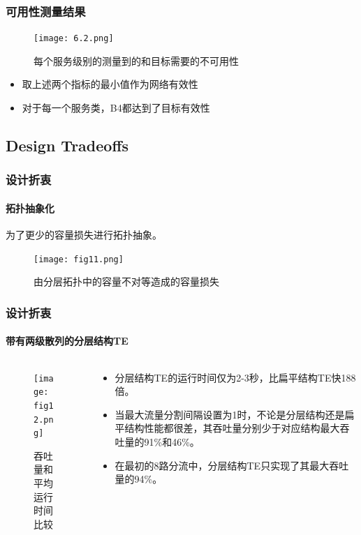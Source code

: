 \begin{frame}
\frametitle{可用性测量结果}
    \begin{figure}
        \centering
        \texttt{[image: 6.2.png]}
        \caption{每个服务级别的测量到的和目标需要的不可用性} %
    \end{figure}
    
    \begin{itemize}
        \item 取上述两个指标的最小值作为网络有效性  
        \item 对于每一个服务类，B4都达到了目标有效性
    \end{itemize}
\end{frame}

\subsection{Design Tradeoffs}

\begin{frame}
    \frametitle{设计折衷}
    \framesubtitle{拓扑抽象化}
    为了更少的容量损失进行拓扑抽象。
    \begin{figure}[h]%
        \centering  %
        \texttt{[image: fig11.png]}  
        \caption{由分层拓扑中的容量不对等造成的容量损失}  %
    \end{figure}
\end{frame}

\begin{frame}
    \frametitle{设计折衷}
    \framesubtitle{带有两级散列的分层结构TE}
    \begin{columns}
        \begin{column}{0.4\textwidth}
           	\begin{figure}[h]%
                \centering  %
                \texttt{[image: fig12.png]}  
                \caption{吞吐量和平均运行时间比较}  %
            \end{figure}
        \end{column}
        \begin{column}{0.6\textwidth}
            \begin{itemize}
        		\item 分层结构TE的运行时间仅为2-3秒，比扁平结构TE快188倍。
        		\item 当最大流量分割间隔设置为1时，不论是分层结构还是扁平结构性能都很差，其吞吐量分别少于对应结构最大吞吐量的91\%和46\%。
        		\item 在最初的8路分流中，分层结构TE只实现了其最大吞吐量的94\%。
        	\end{itemize}
        \end{column}
    \end{columns}
\end{frame}

